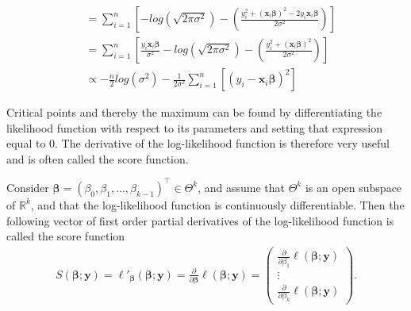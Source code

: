 \begin{example}
\begin{align*}
   &= \sum_{i = 1}^n \left[- log\left( \sqrt{2 \pi \sigma^2}\right) - \left(\frac{y_i^2 + (\textbf{x}_i\boldsymbol{\beta})^2 - 2y_i\textbf{x}_i\boldsymbol{\beta}}{2 \sigma^2}\right) \right]\\
   &= \sum_{i = 1}^n \left[\frac{y_i \textbf{x}_i\boldsymbol{\beta}}{\sigma^2} - log\left( \sqrt{2 \pi \sigma^2}\right) - \left( \frac{y_i^2 + (\textbf{x}_i\boldsymbol{\beta})^2}{2\sigma^2} \right) \right] \\
   &\propto - \frac{n}{2}log( \sigma^2) - \frac{1}{2\sigma^2} \sum_{i = 1}^n \left[(y_i -\textbf{x}_i\boldsymbol{\beta})^2  \right]
\end{align*}
\end{example}
Critical points and thereby the maximum can be found by differentiating the likelihood function with respect to its parameters and setting that expression equal to 0. 
The derivative of the log-likelihood function is therefore very useful and is often called the score function. 
\begin{definition}
\label{def:score_function}
Consider $\boldsymbol{\beta} = (\beta_0, \beta_1, \ldots, \beta_{k-1})^\top \in \Theta^k$, and assume that $\Theta^k$ is an open subspace of $\mathbb{R}^k$, and that the log-likelihood function is continuously differentiable. 
Then the following vector of first order partial derivatives of the log-likelihood function is called the score function
\begin{align*}
    S(\boldsymbol{\beta}; \textbf{y}) = \ell'_{\boldsymbol{\beta}}(\boldsymbol{\beta}; \textbf{y}) = \frac{\partial}{\partial \boldsymbol{\beta}} \ell (\boldsymbol{\beta}; \textbf{y}) = 
    \begin{pmatrix}
        \frac{\partial}{\partial \beta_1}\ell (\boldsymbol{\beta}; \textbf{y}) \\
        \vdots \\
        \frac{\partial}{\partial \beta_k}\ell (\boldsymbol{\beta}; \textbf{y})
    \end{pmatrix}.
\end{align*}
\end{definition}
